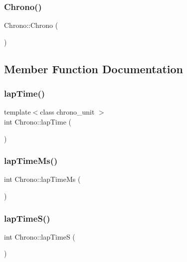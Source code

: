 \subsubsection{\texorpdfstring{Chrono()}{Chrono()}}
{\footnotesize\ttfamily Chrono\+::\+Chrono (\begin{DoxyParamCaption}{ }\end{DoxyParamCaption})\hspace{0.3cm}{\ttfamily [inline]}}



\subsection{Member Function Documentation}
\mbox{\label{class_chrono_a3edbf874477c7342f066b539e7bc493c}} 
\subsubsection{\texorpdfstring{lap\+Time()}{lapTime()}}
{\footnotesize\ttfamily template$<$class chrono\+\_\+unit $>$ \\
int Chrono\+::lap\+Time (\begin{DoxyParamCaption}{ }\end{DoxyParamCaption})\hspace{0.3cm}{\ttfamily [inline]}}

\mbox{\label{class_chrono_ab43a3526cac90d1c50da457c817cdef0}} 
\subsubsection{\texorpdfstring{lap\+Time\+Ms()}{lapTimeMs()}}
{\footnotesize\ttfamily int Chrono\+::lap\+Time\+Ms (\begin{DoxyParamCaption}{ }\end{DoxyParamCaption})\hspace{0.3cm}{\ttfamily [inline]}}

\mbox{\label{class_chrono_a91702be8978d2a969d27c2098ba41196}} 
\subsubsection{\texorpdfstring{lap\+Time\+S()}{lapTimeS()}}
{\footnotesize\ttfamily int Chrono\+::lap\+TimeS (\begin{DoxyParamCaption}{ }\end{DoxyParamCaption})\hspace{0.3cm}{\ttfamily [inline]}}

